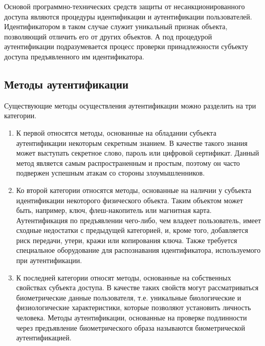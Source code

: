 \documentclass[12pt]{article}
\begin{document}
    \par Основой программно-технических средств защиты от несанкционированного доступа являются процедуры идентификации и аутентификации пользователей. Идентификатором в таком случае служит уникальный признак объекта, позволяющий отличить его от других объектов. А под процедурой аутентификации подразумевается процесс проверки принадлежности субъекту доступа предъявленного им идентификатора.


    \subsection{Методы аутентификации}
    \label{sec:Intro:ApplicationArea:AuthenticationMethods}

    \par Существующие методы осуществления аутентификации можно разделить на три категории.

    \begin{enumerate}
        \item К первой относятся методы, основанные на обладании субъекта аутентификации некоторым секретным знанием. В качестве такого знания может выступать секретное слово, пароль или цифровой сертификат. Данный метод является самым распространенным и простым, поэтому он часто подвержен успешным атакам со стороны злоумышленников.

        \item Ко второй категории относятся методы, основанные на наличии у субъекта идентификации некоторого физического объекта. Таким объектом может быть, например, ключ, флеш-накопитель или магнитная карта. Аутентификация по предъявлении чего-либо, чем владеет пользователь, имеет сходные недостатки с предыдущей категорией, и, кроме того, добавляется риск передачи, утери, кражи или копирования ключа. Также требуется специальное оборудование для распознавания идентификатора, используемого при аутентификации.

        \item К последней категории относят методы, основанные на собственных свойствах субъекта доступа. В качестве таких свойств могут рассматриваться биометрические данные пользователя, т.е. уникальные биологические и физиологические характеристики, которые позволяют установить личность человека. Методы аутентификации, основанные на проверке подлинности через предъявление биометрического образа называются биометрической аутентификацией.
    \end{enumerate}
\end{document}
